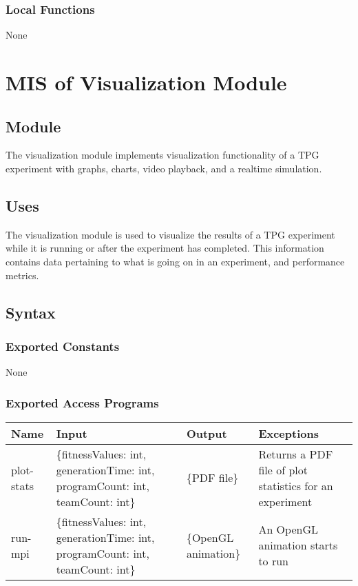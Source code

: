 \documentclass[12pt, titlepage]{article}
\begin{document}
\subsubsection{Local Functions}
None

\section{MIS of Visualization Module} \label{Visualization Module}

\subsection{Module}
The visualization module implements visualization functionality of a TPG experiment with graphs, charts, video playback, and a realtime simulation.

\subsection{Uses}
The visualization module is used to visualize the results of a TPG experiment while it is running or after the experiment has completed. This information contains data pertaining to what is going on in an experiment, and performance metrics.

\subsection{Syntax}

\subsubsection{Exported Constants}
None

\subsubsection{Exported Access Programs}
\begin{center}
  \begin{tabular}{p{2cm} p{4cm} p{4cm} p{4cm}}
  \hline
  \textbf{Name} & \textbf{Input} & \textbf{Output} & \textbf{Exceptions} \\
  \hline
  plot-stats & \{fitnessValues: int, generationTime: int, programCount: int, teamCount: int\} & \{PDF file\} & Returns a PDF file of plot statistics for an experiment \\
  \hline
  run-mpi & \{fitnessValues: int, generationTime: int, programCount: int, teamCount: int\} & \{OpenGL animation\} & An OpenGL animation starts to run \\
  \hline
  
  \end{tabular}
  
  \end{center}
\end{document}
